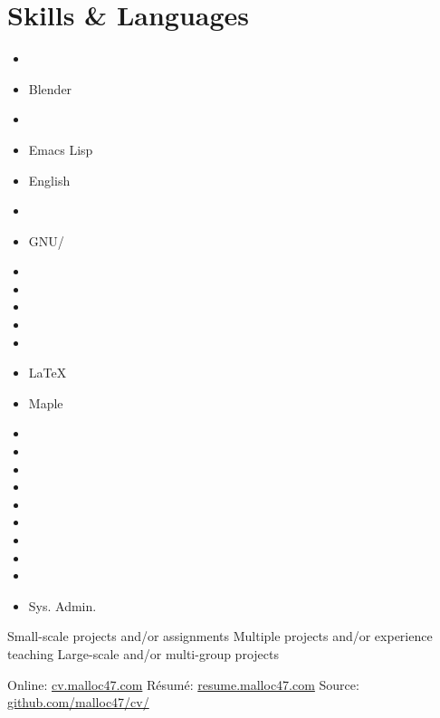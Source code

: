 \documentclass[10pt]{article}
\begin{document}
\begin{minipage}{\linewidth}
\newcommand{\skills}[2]{
  \item #2 #1
}
\section{Skills \& Languages}
\begin{multicols}{4}
\raggedcolumns
\begin{itemize}
\renewcommand{\labelitemi}{}
\renewcommand{\skill}{\textnormal}
\setlength{\itemsep}{1pt}
\setlength{\parskip}{0pt}
\setlength{\parsep}{0pt}

\skills{\bash}{\threeskill}
\skills{Blender}{\twoskill}
\skills{\ccpp}{\threeskill }
\skills{Emacs Lisp}{\oneskill}
\skills{English}{\threeskill}
\skills{\git}{\twoskill}
\skills{GNU/\linux}{\threeskill}
\skills{\haskell}{\oneskill}
\skills{\html}{\threeskill}
\skills{\java}{\threeskill}
\skills{\js}{\twoskill}
\skills{\jquery}{\twoskill}
\skills{\LaTeX}{\twoskill}
\skills{Maple}{\twoskill}
\skills{\matlab}{\threeskill}
\skills{\numpy}{\threeskill}
\skills{\opencv}{\threeskill}
\skills{\php}{\oneskill}
\skills{\python}{\threeskill}
\skills{\django}{\twoskill}
\skills{\scipy}{\threeskill}
\skills{\scheme}{\threeskill}
\skills{\sql}{\twoskill}
\skills{Sys. Admin.}{\threeskill}

\end{itemize}
\end{multicols}
\begin{footnotesize}
  \oneskill Small-scale projects and/or assignments \hfill 
  \twoskill Multiple projects and/or experience teaching \hfill
  \threeskill Large-scale and/or multi-group projects
\end{footnotesize}
\end{minipage}


\null\vfill
\footnotesize{
  Online:  \href{http://cv.malloc47.com}{cv.malloc47.com} \hfill
  Résumé: \href{http://resume.malloc47.com}{resume.malloc47.com} \hfill 
  Source:  \href{https://github.com/malloc47/cv/tree/master}{github.com/malloc47/cv/}
}

\end{document}
